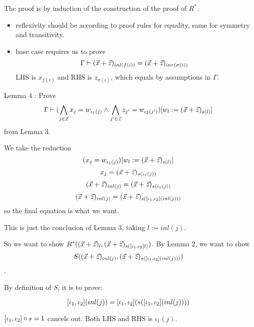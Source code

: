 The proof is by induction of the construction of the proof of $R^*$.

\begin{itemize}
    \item reflexivity should be according to proof rules for equality, same for symmetry and transitivity.
    \item base case requires us to prove
    \[\Gamma\vdash (\vec{x}+\vec{z})_{inl(f(i))} = (\vec{x}+\vec{z})_{inr(\sigma(i))}\]
    LHS is $x_{f(i)}$ and RHS is $z_{\sigma(i)}$, which equals by assumptions in $\Gamma$.
\end{itemize}

Lemma 4 : Prove
\[\Gamma \vdash (\bigwedge_{j\in\vec{x}}x_j = w_{\iota_1(j)}\land \bigwedge_{j'\in\vec{z}}z_{j'}= w_{\iota_2(j')}) [w_l:=(\vec{x}+\vec{z})_{s(l)}] \]
from Lemma 3.

We take the reduction
\[(x_j = w_{\iota_1(j)}) [w_l:=(\vec{x}+\vec{z})_{s(l)}]\]
\[x_j = (\vec{x}+\vec{z})_{s(\iota_1(j))}\]
\[(\vec{x}+\vec{z})_{inl(j)} = (\vec{x}+\vec{z})_{s(\iota_1(j))}\]
\[(\vec{x}+\vec{z})_{inl(j)} = (\vec{x}+\vec{z})_{s([\iota_1,\iota_2] (inl(j)))}\]
so the final equation is what we want.

This is just the conclusion of Lemma 3, taking $l := inl(j)$.

So we want to show $R^*((\vec{x}+\vec{z})_l,(\vec{x}+\vec{z})_{s([\iota_1,\iota_2] l)})$. By Lemma 2, we want to show \[S((\vec{x}+\vec{z})_{inl(j)},(\vec{x}+\vec{z})_{s([\iota_1,\iota_2] (inl(j)))})\].

By definition of $S$, it is to prove:

\[[\iota_1,\iota_2] (inl(j)) = [\iota_1,\iota_2] (s([\iota_1,\iota_2] (inl(j)))) \]

$[\iota_1,\iota_2]\circ s = 1$ cancels out. Both LHS and RHS is $\iota_1(j)$.

